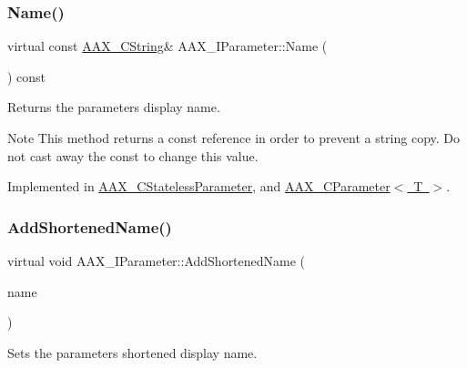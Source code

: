 \mbox{\label{a01857_ae1dae8844a16492726cb6caac7e2e822}} 
\subsubsection{\texorpdfstring{Name()}{Name()}}
{\footnotesize\ttfamily virtual const \mbox{\hyperlink{a01573}{A\+A\+X\+\_\+\+C\+String}}\& A\+A\+X\+\_\+\+I\+Parameter\+::\+Name (\begin{DoxyParamCaption}{ }\end{DoxyParamCaption}) const\hspace{0.3cm}{\ttfamily [pure virtual]}}



Returns the parameter\textquotesingle{}s display name. 

\begin{DoxyNote}{Note}
This method returns a const reference in order to prevent a string copy. Do not cast away the const to change this value. 
\end{DoxyNote}


Implemented in \mbox{\hyperlink{a01541_a191fc266252f440feca3f3138e706cb8}{A\+A\+X\+\_\+\+C\+Stateless\+Parameter}}, and \mbox{\hyperlink{a01537_a0ca723751549cff4168198f8480b28e9}{A\+A\+X\+\_\+\+C\+Parameter$<$ T $>$}}.

\mbox{\label{a01857_a642ce0054e136c75fe402ebd53a4eb90}} 
\subsubsection{\texorpdfstring{AddShortenedName()}{AddShortenedName()}}
{\footnotesize\ttfamily virtual void A\+A\+X\+\_\+\+I\+Parameter\+::\+Add\+Shortened\+Name (\begin{DoxyParamCaption}\item[{const \mbox{\hyperlink{a01573}{A\+A\+X\+\_\+\+C\+String}} \&}]{name }\end{DoxyParamCaption})\hspace{0.3cm}{\ttfamily [pure virtual]}}



Sets the parameter\textquotesingle{}s shortened display name. 

